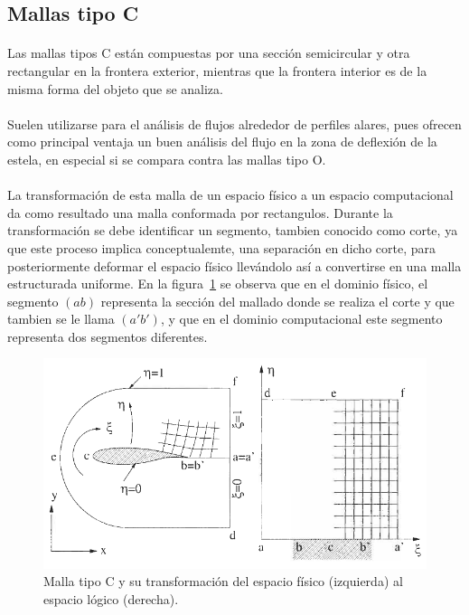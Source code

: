 \documentclass[letterpaper, openright, 12pt]{book}
\begin{document}
    \subsection{Mallas tipo C}
    \paragraph*{}
        Las mallas tipos C están compuestas por una sección semicircular y otra
        rectangular en la frontera exterior, mientras que la frontera interior
        es de la misma forma del objeto que se analiza.
    \paragraph*{}
        Suelen utilizarse para el análisis de flujos alrededor de perfiles
        alares, pues ofrecen como principal ventaja un buen análisis del flujo
        en la zona de deflexión de la estela, en especial si se compara contra
        las mallas tipo O.\cite{best-practices-grid-generation}
    \paragraph{}
        La transformación de esta malla de un espacio físico a un espacio
        computacional da como resultado una malla conformada por rectangulos.
        Durante la transformación se debe identificar un segmento, tambien
        conocido como corte, ya que este proceso implica conceptualemte, una
        separación en dicho corte, para posteriormente deformar el espacio
        físico llevándolo así a convertirse en una malla estructurada uniforme.
        En la figura~\ref{fig:malla-c} se observa que en el dominio físico, el
        segmento $(ab)$ representa la sección del mallado donde se realiza el
        corte y que tambien se le llama $(a'b')$, y que en el dominio
        computacional este segmento representa dos segmentos diferentes.
            \begin{figure}[htbp!]
                \centering
                \includegraphics[keepaspectratio, width=155mm]{./Imagenes/malla-c}
                \captionsetup{justification=centering, margin=2cm}
                \caption[Malla tipo C]{Malla tipo C y su transformación del espacio físico (izquierda) al espacio lógico (derecha). \cite{blazek}}
                \label{fig:malla-c}
            \end{figure}
\end{document}
